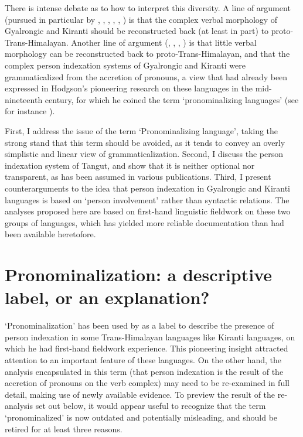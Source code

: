 \documentclass[oldfontcommands,oneside,a4paper,11pt]{article}
\begin{document}
There is intense debate as to how to interpret this diversity. A line of argument (pursued in particular by \citealt{bauman75}, \citealt{delancey89agreement}, \citealt{driem93agreement}, \citealt{delancey10agreement}, \citealt{delancey11prefixes}, \citealt{jacques12agreement}) is that the complex verbal morphology of Gyalrongic and Kiranti should be reconstructed back (at least in part) to proto-Trans-Himalayan. Another line of argument (\citealt{lapolla92},  \citealt{lapolla03}, \citealt{lapolla12comments}, \citealt{zeisler15eat}) is that little verbal morphology can be reconstructed back to proto-Trans-Himalayan, and that the complex person indexation systems of Gyalrongic and Kiranti were grammaticalized from the accretion of pronouns, a view that had already been expressed in Hodgson's pioneering research on these languages in the mid-nineteenth century, for which he coined the term `pronominalizing languages' (see for instance  \citealt{hodgson57sifan}).

 

First, I address the issue of the term `Pronominalizing language', taking the strong stand that this term should be avoided, as it tends to convey an overly simplistic and linear view of grammaticalization. Second, I discuss the person indexation system of Tangut, and show that it is neither optional nor transparent, as has been assumed in various publications. Third, I present counterarguments to the idea that person indexation in Gyalrongic and Kiranti languages is based on `person involvement' rather than syntactic relations. The analyses proposed here are based on first-hand linguistic fieldwork on these two groups of languages, which has yielded more reliable documentation than had been available heretofore.

\section{Pronominalization: a descriptive label, or an explanation?}
`Pronominalization' has been used by \citet{hodgson57sifan} as a label to describe the presence of person indexation in some Trans-Himalayan languages like Kiranti languages, on which he had first-hand fieldwork experience. This pioneering insight attracted attention to an important feature of these languages. On the other hand, the analysis encapsulated in this term (that person indexation is the result of the accretion of pronouns on the verb complex) may need to be re-examined in full detail, making use of newly available evidence. To preview the result of the re-analysis set out below, it would appear useful to recognize that the term `pronominalized' is now outdated and potentially misleading, and should be retired for at least three reasons.
\end{document}
